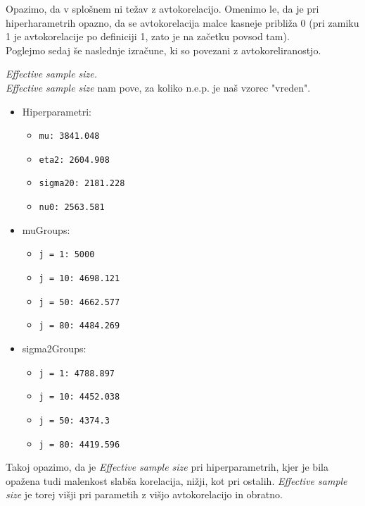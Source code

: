\documentclass[a4paper,11pt]{article}
\begin{document}
\noindent
Opazimo, da v splošnem ni težav z avtokorelacijo. Omenimo le, da je pri hiperharametrih opazno, da se avtokorelacija malce kasneje približa 0 (pri zamiku 1 je avtokorelacije po definiciji 1, zato je na začetku povsod tam).
\\
Poglejmo sedaj še naslednje izračune, ki so povezani z avtokoreliranostjo.

\newpage
\noindent
\textit{Effective sample size.}
\\
\textit{Effective sample size} nam pove, za koliko n.e.p. je naš vzorec "vreden".

\begin{itemize}
    \item Hiperparametri:
        \begin{itemize}
            \item \texttt{mu: 3841.048}
            \item \texttt{eta2: 2604.908}
            \item \texttt{sigma20: 2181.228}
            \item \texttt{nu0: 2563.581 }
        \end{itemize}
    \item muGroups:
        \begin{itemize}
            \item \texttt{j = 1: 5000 }
            \item \texttt{j = 10: 4698.121 }
            \item \texttt{j = 50: 4662.577 }
            \item \texttt{j = 80: 4484.269 }
        \end{itemize}
    \item sigma2Groups:
        \begin{itemize}
            \item \texttt{j = 1: 4788.897}
            \item \texttt{j = 10: 4452.038}
            \item \texttt{j = 50: 4374.3 }
            \item \texttt{j = 80: 4419.596 }
        \end{itemize}
\end{itemize}

\noindent
Takoj opazimo, da je \textit{Effective sample size} pri hiperparametrih, kjer je bila opažena tudi malenkost slabša korelacija, nižji, kot pri ostalih.
\textit{Effective sample size} je torej višji pri parametih z višjo avtokorelacijo in obratno.
\end{document}
